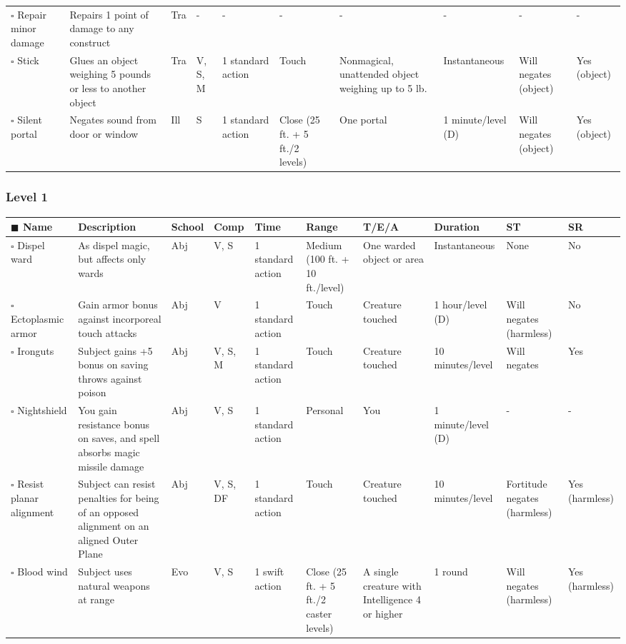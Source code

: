 \documentclass[12pt, a4paper]{article}
\begin{document}
\begin{center}
\begin{longtable}[H]{ p{8em} p{15em} p{2em} p{5em} p{6em} p{6em} p{10em} p{6em} p{5em} p{2em} }
    \(\square\) Repair minor damage & Repairs 1 point of damage to any construct & Tra & - & - & - & - & - & - & -\\
    \(\square\) Stick & Glues an object weighing 5 pounds or less to another object & Tra & V, S, M & 1 standard action & Touch & Nonmagical, unattended object weighing up to 5 lb. & Instantaneous & Will negates (object) & Yes (object)\\
    \(\square\) Silent portal & Negates sound from door or window & Ill & S & 1 standard action & Close (25 ft. + 5 ft./2 levels) & One portal & 1 minute/level (D) & Will negates (object) & Yes (object)\\
  \end{longtable}

  \subsubsection*{Level 1}
  \begin{longtable}[H]{ p{8em} p{15em} p{2em} p{5em} p{6em} p{6em} p{10em} p{6em} p{5em} p{2em} }
    \(\blacksquare\) \textbf{Name} & \textbf{Description} & \textbf{School} & \textbf{Comp} & \textbf{Time} & \textbf{Range} & \textbf{T/E/A} & \textbf{Duration} & \textbf{ST} & \textbf{SR}\\
    \endhead
    \(\square\) Dispel ward & As dispel magic, but affects only wards & Abj & V, S & 1 standard action & Medium (100 ft. + 10 ft./level) & One warded object or area & Instantaneous & None & No\\
    \(\square\) Ectoplasmic armor & Gain armor bonus against incorporeal touch attacks & Abj & V & 1 standard action & Touch & Creature touched & 1 hour/level (D) & Will negates (harmless) & No\\
    \(\square\) Ironguts & Subject gains +5 bonus on saving throws against poison & Abj & V, S, M & 1 standard action & Touch & Creature touched & 10 minutes/level & Will negates & Yes\\
    \(\square\) Nightshield & You gain resistance bonus on saves, and spell absorbs magic missile damage & Abj & V, S & 1 standard action & Personal & You & 1 minute/level (D) & - & -\\
    \(\square\) Resist planar alignment & Subject can resist penalties for being of an opposed alignment on an aligned Outer Plane & Abj & V, S, DF & 1 standard action & Touch & Creature touched & 10 minutes/level & Fortitude negates (harmless) & Yes (harmless)\\
    \(\square\) Blood wind & Subject uses natural weapons at range & Evo & V, S & 1 swift action & Close (25 ft. + 5 ft./2 caster levels) & A single creature with Intelligence 4 or higher & 1 round & Will negates (harmless) & Yes (harmless)\\

\end{longtable}
\end{center}
\end{document}
